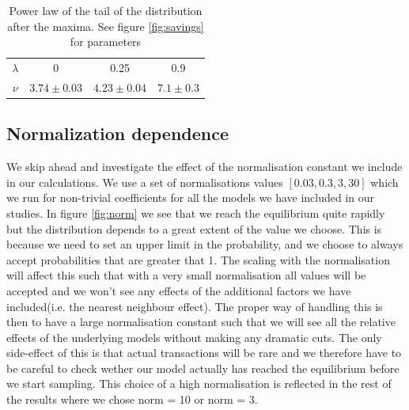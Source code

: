 \documentclass[a4paper,11pt]{article}
\begin{document}
{\begin{table}[h]
\caption{Power law of the tail of the distribution after the maxima. See figure \ref{fig:savings} for parameters}
\begin{center}
\begin{tabular}{c|c|c|c}
$\lambda$ & 0 & 0.25 & 0.9 \\
$\nu$ & $3.74\pm 0.03$ & $4.23\pm 0.04$ & $7.1\pm0.3$
\end{tabular}
\end{center}
\label{tab:savings}
\end{table}%


\subsection{Normalization dependence}
We skip ahead and investigate the effect of the normalisation constant we include in our calculations. We use a set of normalisations values $[0.03,0.3,3,30]$ which we run for non-trivial coefficients for all the models we have included in our studies. In figure \ref{fig:norm} we see that we reach the equilibrium quite rapidly but the distribution depends to a great extent of the value we choose. This is because we need to set an upper limit in the probability, and we choose to always accept probabilities that are greater that 1. The scaling with the normalisation will affect this such that with a very small normalisation all values will be accepted and we won't see any effects of the additional factors we have included(i.e. the nearest neighbour effect). The proper way of handling this is then to have a large normalisation constant such that we will see all the relative effects of the underlying models without making any dramatic cuts. The only side-effect of this is that actual transactions will be rare and we therefore have to be careful to check wether our model actually has reached the equilibrium before we start sampling. This choice of a high normalisation is reflected in the rest of the results where we chose norm = 10 or norm = 3. 

}
\end{document}

